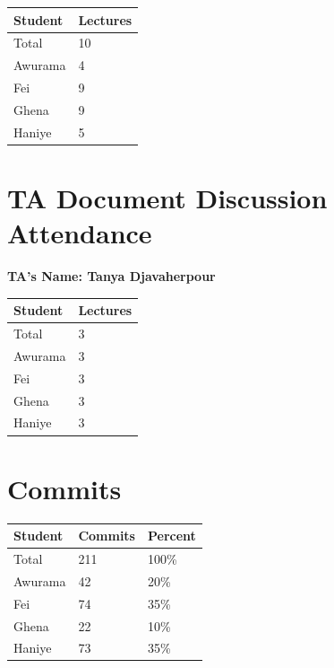 \documentclass{article}
\begin{document}
\begin{table}[H]
\centering
\begin{tabular}{ll}
\toprule
\textbf{Student} & \textbf{Lectures}\\
\midrule
Total & 10\\
Awurama & 4\\
Fei & 9\\
Ghena & 9\\
Haniye & 5\\
\bottomrule
\end{tabular}
\end{table}

\section{TA Document Discussion Attendance}

\noindent \textbf{TA's Name: Tanya Djavaherpour}

\begin{table}[H]
\centering
\begin{tabular}{ll}
\toprule
\textbf{Student} & \textbf{Lectures}\\
\midrule
Total & 3\\
Awurama & 3\\
Fei & 3\\
Ghena & 3\\
Haniye & 3\\
\bottomrule
\end{tabular}
\end{table}

\section{Commits}


\begin{table}[H]
\centering
\begin{tabular}{lll}
\toprule
\textbf{Student} & \textbf{Commits} & \textbf{Percent}\\
\midrule
Total & 211 & 100\% \\
Awurama & 42& 20\% \\
Fei & 74& 35\% \\
Ghena & 22& 10\% \\
Haniye & 73& 35\% \\
\bottomrule
\end{tabular}
\end{table}
\end{document}
